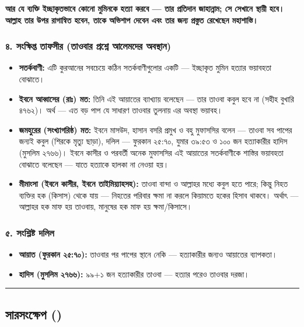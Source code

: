 \textbf{আর যে ব্যক্তি ইচ্ছাকৃতভাবে কোনো মুমিনকে হত্যা করবে — তার প্রতিদান জাহান্নাম; সে সেখানে স্থায়ী হবে। আল্লাহ তার উপর রাগান্বিত হবেন, তাকে অভিশাপ দেবেন এবং তার জন্য প্রস্তুত রেখেছেন মহাশাস্তি।}

\subsubsection*{৪. সংক্ষিপ্ত তাফসীর (তাওবার প্রশ্নে আলেমদের অবস্থান)}

\begin{itemize}
\item \textbf{সতর্কবাণী:} এটি কুরআনের সবচেয়ে কঠিন সতর্কবাণীগুলোর একটি — ইচ্ছাকৃত মুমিন হত্যার ভয়াবহতা বোঝাতে।
\item \textbf{ইবনে আব্বাসের (রাঃ) মত:} তিনি এই আয়াতের ব্যাখ্যায় বলেছেন — তার তাওবা কবুল হবে না (সহীহ বুখারি ৪৭৬২)। অর্থ — এত বড় পাপ যে সাধারণ তাওবার তুলনায় এর অবস্থা ভয়াবহ।
\item \textbf{জমহুরের (সংখ্যাগরিষ্ঠ) মত:} ইবনে মাসউদ, হাসান বসরি প্রমুখ ও বহু মুফাসসির বলেন — তাওবা সব পাপের জন্যই কবুল (শিরকে মৃত্যু ছাড়া), দলিল — ফুরকান ২৫:৭০, যুমার ৩৯:৫৩ ও ১০০ জন হত্যাকারীর হাদিস (মুসলিম ২৭৬৬)। ইবনে কাসীর ও পরবর্তী অনেক মুফাসসির এই আয়াতের সতর্কবাণীকে শাস্তির ভয়াবহতা বোঝাতে বলেছেন — যাতে হত্যাকে হালকা না নেওয়া হয়।
\item \textbf{মীমাংসা (ইবনে কাসীর, ইবনে তাইমিয়্যাহসহ):} তাওবা বান্দা ও আল্লাহর মধ্যে কবুল হতে পারে; কিন্তু নিহত ব্যক্তির হক (কিসাস) থেকে যায় — নিহতের পরিবার ক্ষমা না করলে কিয়ামতে হকের হিসাব থাকবে। অর্থাৎ — আল্লাহর হক মাফ হয় তাওবায়, মানুষের হক মাফ হয় ক্ষমা/কিসাসে।
\end{itemize}
\subsubsection*{৫. সংশ্লিষ্ট দলিল}

\begin{itemize}
\item \textbf{আয়াত (ফুরকান ২৫:৭০):} তাওবার পর পাপের স্থানে নেকি — হত্যাকারীর জন্যও আয়াতের ব্যাপকতা।
\item \textbf{হাদিস (মুসলিম ২৭৬৬):} ৯৯+১ জন হত্যাকারীর তাওবা — হত্যার পরেও তাওবার দরজা।
\end{itemize}
\medskip\hrule\medskip

\subsection*{সারসংক্ষেপ ()}

